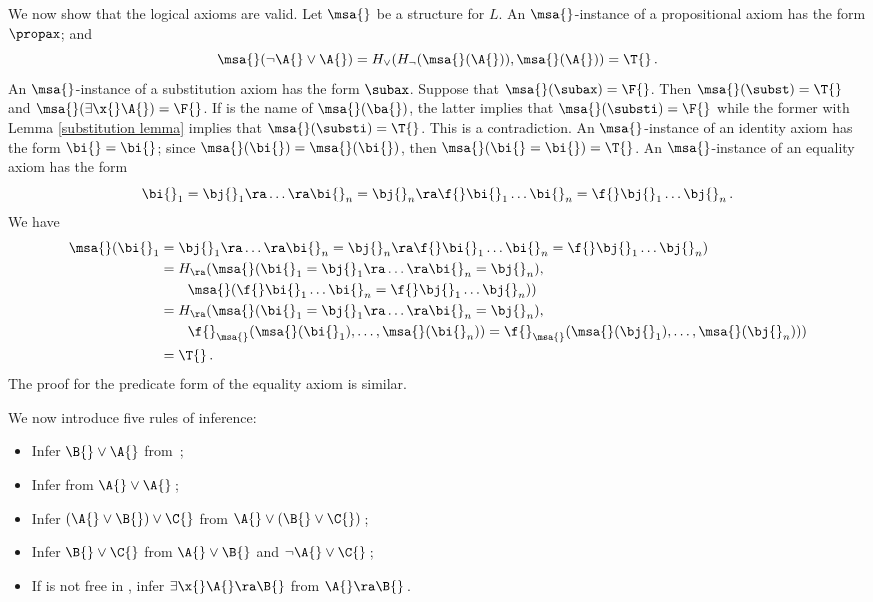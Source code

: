We now show that the logical axioms are valid.
Let $\msa{}$ be a structure for $L$.
An $\msa{}$-instance of a propositional axiom has the form $\propax$; and
\[\msa{}(\neg \A{} \vee \A{}) = H_\vee (H_\neg (\msa{}(\A{})), \msa{} (\A{})) = \T{}\,.\]
An $\msa{}$-instance of a substitution axiom has the form $\subax$.
Suppose that $\msa{} (\subax) = \F{}$.
Then $\msa{} (\subst) = \T{}$ and $\msa{} (\exists \x{} \A{}) = \F{}$.
If \bi{} is the name of $\msa{} (\ba{})$, the latter implies that $\msa{} (\substi) = \F{}$ while the former with Lemma \eqref{substitution lemma} implies that $\msa{} (\substi) = \T{}$.
This is a contradiction.
An $\msa{}$-instance of an identity axiom has the form $\bi{} = \bi{}$;
since $\msa{} (\bi{}) = \msa{} (\bi{})$, then $\msa{} (\bi{} = \bi{}) = \T{}$.
An $\msa{}$-instance of an equality axiom has the form
\[\bi{}_1 = \bj{}_1 \ra \dots \ra \bi{}_n = \bj{}_n \ra \f{} \bi{}_1 \dots \bi{}_n = \f{} \bj{}_1 \dots \bj{}_n\,.\]
We have
\begin{align*}
    \msa{} (\bi{}_1 &= \bj{}_1 \ra \dots \ra \bi{}_n = \bj{}_n \ra \f{} \bi{}_1 \dots \bi{}_n = \f{} \bj{}_1 \dots \bj{}_n)\\
        &= H_\ra (\msa{} (\bi{}_1 = \bj{}_1 \ra \dots \ra \bi{}_n = \bj{}_n),\\
            &\qquad \msa{} (\f{} \bi{}_1 \dots \bi{}_n = \f{} \bj{}_1 \dots \bj{}_n))\\
        &= H_\ra (\msa{} (\bi{}_1 = \bj{}_1 \ra \dots \ra \bi{}_n = \bj{}_n),\\
            &\qquad \f{}_\msa{} (\msa{} (\bi{}_1), \dots, \msa{} (\bi{}_n)) = \f{}_\msa{} (\msa{} (\bj{}_1), \dots, \msa{} (\bj{}_n)))\\
        &= \T{}\,.
\end{align*}
The proof for the predicate form of the equality axiom is similar.

We now introduce five rules of inference:
\begin{itemize}
    \item {} Infer $\B{} \vee \A{}$ from \A{}\,;
    \item {} Infer \A{} from $\A{} \vee \A{}$\,;
    \item {} Infer $(\A{} \vee \B{}) \vee \C{}$ from $\A{} \vee (\B{} \vee \C{})$\,;
    \item {} Infer $\B{} \vee \C{}$ from $\A{} \vee \B{}$ and $\neg \A{} \vee \C{}$\,;
    \item {} If \x{} is not free in \B{}, infer $\exists \x{} \A{} \ra \B{}$ from $\A{} \ra \B{}$\,.
\end{itemize}

